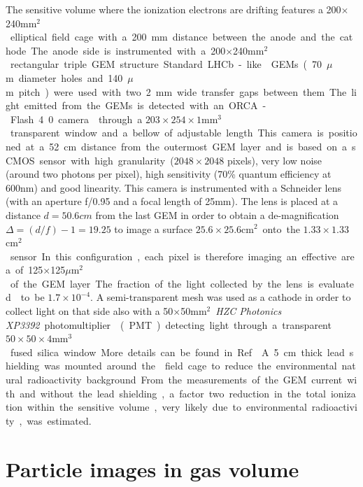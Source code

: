 \documentclass[12pt]{iopart}
\begin{document}
%
The sensitive volume where the ionization electrons are drifting
 features a 200$\times$240\unit{mm$^2$} elliptical field cage
with a 200 mm distance between the anode and the cathode. The anode
side is instrumented with a 200$\times$240\unit{mm$^2$} rectangular
triple GEM structure.  Standard LHCb-like \cite{bib:thesis} GEMs
(70\unit{$\mu$m} diameter holes and 140\unit{$\mu$m} pitch) were used
with two 2\unit{mm} wide transfer gaps between them. The light emitted
from the GEMs is detected with an ORCA-Flash 4.0 camera
\cite{ORCAcamera} through a $203\times254\times1$\unit{mm$^3$}
transparent window and a bellow of adjustable length.  This camera
is positioned at a 52 cm distance from the outermost GEM layer and is
based on a sCMOS sensor with high granularity ($2048\times2048$
pixels), very low noise (around two photons per pixel), high
sensitivity (70\% quantum efficiency at 600\unit{nm}) and good
linearity. This camera is instrumented with a Schneider lens (with an
aperture f/0.95 and a focal length of 25\unit{mm}). The lens is placed
at a distance $d=50.6\unit{cm}$ from the last GEM in order to
obtain a de-magnification $\Delta = (d/f) - 1 = 19.25$ to image a
surface $25.6 \times 25.6$\unit{cm$^2$} onto the $1.33 \times
1.33$\unit{cm$^2$} sensor.  In this configuration, each pixel is
therefore imaging an effective area of 125$\times$125\unit{$\mu$m$^2$}
of the GEM layer. The fraction of the light collected by the lens is
evaluated \cite{bib:jinst_orange1} to be $1.7 \times 10^{-4}$.
%
A semi-transparent mesh was used as a cathode in order to collect
light on that side also with a 50$\times$50\unit{mm$^2$} \textit{HZC
  Photonics XP3392} photomultiplier \cite{PMTPhotonics} (PMT)
detecting light through a transparent $50\times50\times4$\unit{mm$^3$}
fused silica window. More details can be found in Ref.~\cite{paperBTF}.

A 5\unit{cm} thick lead shielding was mounted around the \lemon field
cage to reduce the environmental natural radioactivity
background. From the measurements of the GEM current with and without
the lead shielding, a factor two reduction in the total ionization
within the sensitive volume, very likely due to environmental
radioactivity, was estimated.


\section{Particle images  in \lemon gas volume}
\end{document}
